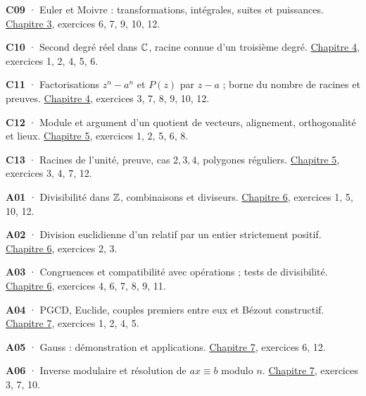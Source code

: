 \noindent\textbf{C09} · Euler et Moivre : transformations, intégrales, suites et puissances. \hyperref[chap-3]{Chapitre 3}, exercices 6, 7, 9, 10, 12.\par\vspace{1.7mm}
\noindent\textbf{C10} · Second degré réel dans $\mathbb{C}$, racine connue d’un troisième degré. \hyperref[chap-4]{Chapitre 4}, exercices 1, 2, 4, 5, 6.\par\vspace{1.7mm}
\noindent\textbf{C11} · Factorisations $z^n-a^n$ et $P(z)$ par $z-a$ ; borne du nombre de racines et preuves. \hyperref[chap-4]{Chapitre 4}, exercices 3, 7, 8, 9, 10, 12.\par\vspace{1.7mm}
\noindent\textbf{C12} · Module et argument d’un quotient de vecteurs, alignement, orthogonalité et lieux. \hyperref[chap-5]{Chapitre 5}, exercices 1, 2, 5, 6, 8.\par\vspace{1.7mm}
\noindent\textbf{C13} · Racines de l’unité, preuve, cas $2,3,4$, polygones réguliers. \hyperref[chap-5]{Chapitre 5}, exercices 3, 4, 7, 12.\par\vspace{1.7mm}
\noindent\textbf{A01} · Divisibilité dans $\mathbb{Z}$, combinaisons et diviseurs. \hyperref[chap-6]{Chapitre 6}, exercices 1, 5, 10, 12.\par\vspace{1.7mm}
\noindent\textbf{A02} · Division euclidienne d’un relatif par un entier strictement positif. \hyperref[chap-6]{Chapitre 6}, exercices 2, 3.\par\vspace{1.7mm}
\noindent\textbf{A03} · Congruences et compatibilité avec opérations ; tests de divisibilité. \hyperref[chap-6]{Chapitre 6}, exercices 4, 6, 7, 8, 9, 11.\par\vspace{1.7mm}
\noindent\textbf{A04} · PGCD, Euclide, couples premiers entre eux et Bézout constructif. \hyperref[chap-7]{Chapitre 7}, exercices 1, 2, 4, 5.\par\vspace{1.7mm}
\noindent\textbf{A05} · Gauss : démonstration et applications. \hyperref[chap-7]{Chapitre 7}, exercices 6, 12.\par\vspace{1.7mm}
\noindent\textbf{A06} · Inverse modulaire et résolution de $ax\equiv b$ modulo $n$. \hyperref[chap-7]{Chapitre 7}, exercices 3, 7, 10.\par\vspace{1.7mm}
